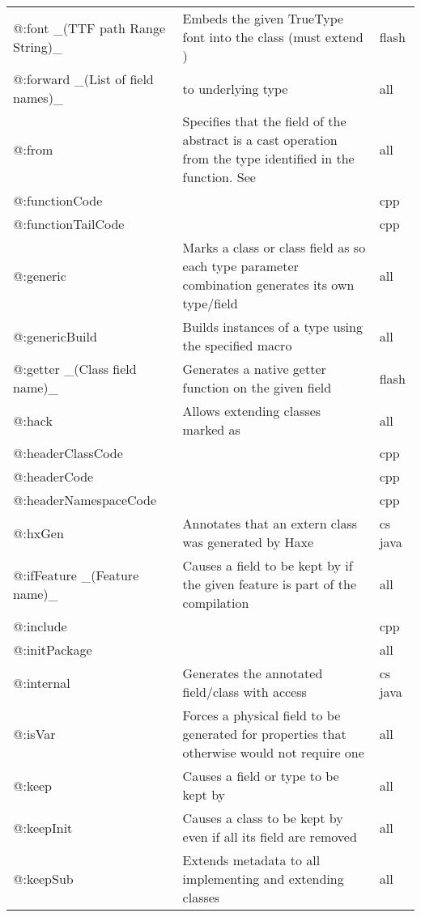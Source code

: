 \begin{center}
\begin{tabular}{| l | l | l |}
	@:font \_(TTF path Range String)\_  &  Embeds the given TrueType font into the class (must extend \expr{flash.text.Font})  &  flash \\
	@:forward \_(List of field names)\_  &  \tref{Forwards field access}{types-abstract-forward} to underlying type  &  all \\
	@:from   &  Specifies that the field of the abstract is a cast operation from the type identified in the function. See \tref{Implicit Casts}{types-abstract-implicit-casts}  &  all \\
	@:functionCode  &     &  cpp \\
	@:functionTailCode  &    &  cpp \\
	@:generic &  Marks a class or class field as \tref{generic}{type-system-generic} so each type parameter combination generates its own type/field  &  all \\
	@:genericBuild  &  Builds instances of a type using the specified macro   &  all \\
	@:getter \_(Class field name)\_  &  Generates a native getter function on the given field   &  flash \\
	@:hack   &  Allows extending classes marked as \expr{@:final}  &  all \\
	@:headerClassCode  &    &  cpp \\
	@:headerCode   &     &  cpp \\
	@:headerNamespaceCode  &    &  cpp \\
	@:hxGen  &  Annotates that an extern class was generated by Haxe  &  cs  java \\
	@:ifFeature \_(Feature name)\_  &  Causes a field to be kept by \tref{DCE}{cr-dce} if the given feature is part of the compilation  &  all \\
	@:include &     &  cpp \\
	@:initPackage  &    &  all \\
	@:internal  &  Generates the annotated field/class with \expr{internal} access  &  cs  java \\
	@:isVar  &  Forces a physical field to be generated for properties that otherwise would not require one  &  all \\
	@:keep   &  Causes a field or type to be kept by \tref{DCE}{cr-dce}  &  all \\
	@:keepInit  &  Causes a class to be kept by \tref{DCE}{cr-dce} even if all its field are removed  &  all \\
	@:keepSub &  Extends \expr{@:keep} metadata to all implementing and extending classes  &  all \\

\end{tabular}
\end{center}
